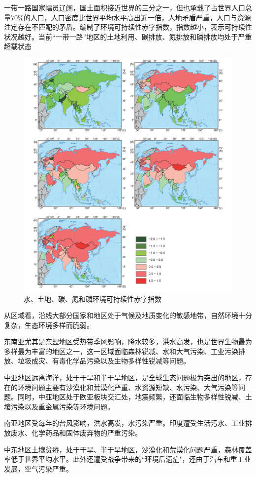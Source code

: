 一带一路国家幅员辽阔，国土面积接近世界的三分之一，但也承载了占世界人口总量70\%的人口，人口密度比世界平均水平高出近一倍，人地矛盾严重，人口与资源注定存在不匹配的矛盾。\citet{方恺2021}编制了环境可持续性赤字指数，指数越小，表示可持续性状况越好。当前“一带一路”地区的土地利用、碳排放、氮排放和磷排放均处于严重超载状态
\begin{figure}[H]
    \centering
    \includegraphics[width=0.8\linewidth]{img/ff.jpeg}
    \caption{水、土地、碳、氮和磷环境可持续性赤字指数\citet{方恺2021}}
\end{figure}

从区域看，沿线大部分国家和地区处于气候及地质变化的敏感地带，自然环境十分复杂，生态环境多样而脆弱。

东南亚尤其是东盟地区受热带季风影响，降水较多，洪水高发，也是世界生物最为多样最为丰富的地区之一，这一区域面临森林锐减、水和大气污染、工业污染排放、垃圾成灾、有毒化学品污染以及生物多样性锐减等问题。

中亚地区远离海洋，处于干旱和半干旱地区，是全球生态问题极为突出的地区，存在的环境问题主要有沙漠化和荒漠化严重、水资源短缺、水污染、大气污染等问题。同时，中亚地区处于欧亚板块交汇处，地震频繁，还面临生物多样性锐减、土壤污染以及重金属污染等环境问题。

南亚地区受每年的台风影响，洪水高发，水污染严重。印度遭受生活污水、工业排放废水、化学药品和固体废弃物的严重污染。

中东地区土壤贫瘠，处于干旱、半干旱地区，沙漠化和荒漠化问题严重，森林覆盖率低于世界平均水平。此外还遭受战争带来的“环境后遗症"，还由于汽车和重工业发展，空气污染严重。

